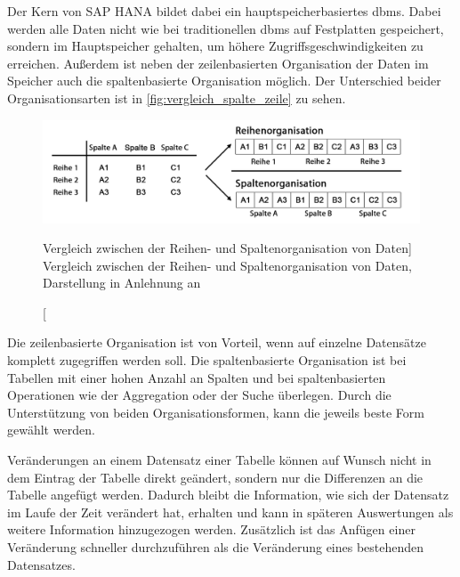 \begin{onehalfspacing}
Der Kern von SAP HANA bildet dabei ein hauptspeicherbasiertes \gls{dbms}. Dabei werden alle Daten nicht wie bei traditionellen \gls{dbms} auf Festplatten gespeichert, sondern im Hauptspeicher gehalten, um höhere Zugriffsgeschwindigkeiten zu erreichen. Außerdem ist neben der zeilenbasierten Organisation der Daten im Speicher auch die spaltenbasierte Organisation möglich. Der Unterschied beider Organisationsarten ist in \vref{fig:vergleich_spalte_zeile} zu sehen. 

\begin{figure}[ht]
\centering
\setlength{\unitlength}{1mm}
\includegraphics[width=15cm]{images/in-memory-row-column.pdf}
\caption
[Vergleich zwischen der Reihen- und Spaltenorganisation von Daten]
{Vergleich zwischen der Reihen- und Spaltenorganisation von Daten, Darstellung in Anlehnung an  \label{fig:vergleich_spalte_zeile}}
\end{figure}

Die zeilenbasierte Organisation ist von Vorteil, wenn auf einzelne Datensätze komplett zugegriffen werden soll. Die spaltenbasierte Organisation ist bei Tabellen mit einer hohen Anzahl an Spalten und bei spaltenbasierten Operationen wie der Aggregation oder der Suche überlegen. Durch die Unterstützung von beiden Organisationsformen, kann die jeweils beste Form gewählt werden.

Veränderungen an einem Datensatz einer Tabelle können auf Wunsch nicht in dem Eintrag der Tabelle direkt geändert, sondern nur die Differenzen an die Tabelle angefügt werden. Dadurch bleibt die Information, wie sich der Datensatz im Laufe der Zeit verändert hat, erhalten und kann in späteren Auswertungen als weitere Information hinzugezogen werden. Zusätzlich ist das Anfügen einer Veränderung schneller durchzuführen als die Veränderung eines bestehenden Datensatzes.


\end{onehalfspacing}
